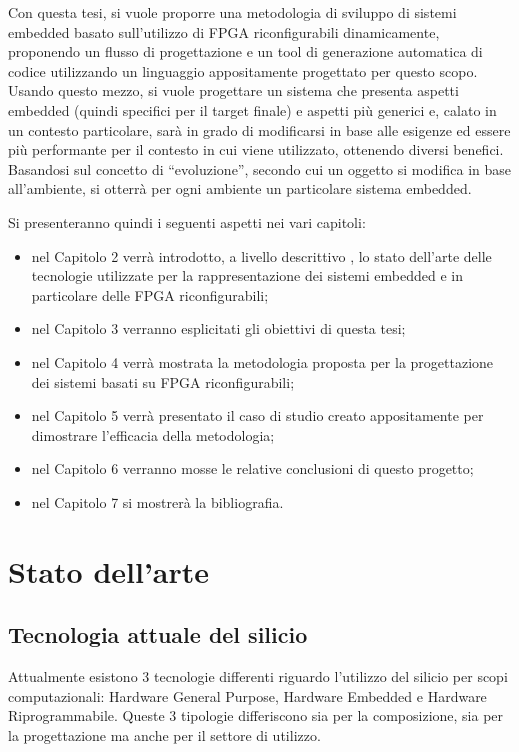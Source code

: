 \documentclass[a4paper,titlepage]{book}
\begin{document}
Con questa tesi, si vuole proporre una metodologia di sviluppo di sistemi embedded basato sull'utilizzo di FPGA riconfigurabili dinamicamente, proponendo un flusso di progettazione e un tool di generazione automatica di codice utilizzando un linguaggio appositamente progettato per questo scopo. Usando questo mezzo, si vuole progettare un sistema che presenta aspetti embedded (quindi specifici per il target finale) e aspetti più generici e, calato in un contesto particolare, sarà in grado di modificarsi in base alle esigenze ed essere più performante per il contesto in cui viene utilizzato, ottenendo diversi benefici. Basandosi sul concetto di ``evoluzione'', secondo cui un oggetto si modifica in base all'ambiente, si otterrà per ogni ambiente un particolare sistema embedded.

Si presenteranno quindi i seguenti aspetti nei vari capitoli:

\begin{itemize}
\item nel Capitolo 2 verrà introdotto, a livello descrittivo , lo stato dell'arte delle tecnologie utilizzate per la rappresentazione dei sistemi embedded e in particolare delle FPGA riconfigurabili; 
\item nel Capitolo 3 verranno esplicitati gli obiettivi di questa tesi; 
\item nel Capitolo 4 verrà mostrata la metodologia proposta per la progettazione dei sistemi basati su FPGA riconfigurabili; 
\item nel Capitolo 5 verrà presentato il caso di studio creato appositamente per dimostrare l'efficacia della metodologia;
\item nel Capitolo 6 verranno mosse le relative conclusioni di questo progetto;
\item nel Capitolo 7 si mostrerà la bibliografia.
\end{itemize}

\chapter{Stato dell'arte}

\section{Tecnologia attuale del silicio}
Attualmente esistono 3 tecnologie differenti riguardo l'utilizzo del silicio per scopi computazionali: Hardware General Purpose, Hardware Embedded e Hardware Riprogrammabile. Queste 3 tipologie differiscono sia per la composizione, sia per la progettazione ma anche per il settore di utilizzo.
\end{document}

